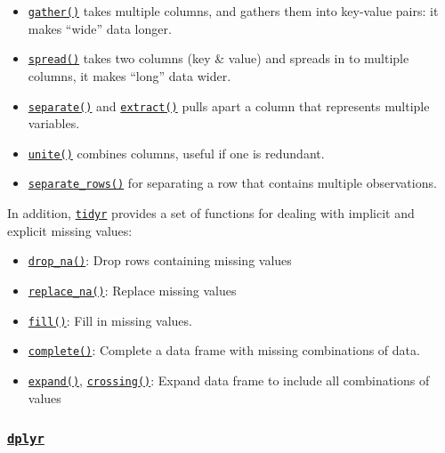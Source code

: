 \documentclass[]{book}
\providecommand{\tightlist}{%
  \setlength{\itemsep}{0pt}\setlength{\parskip}{0pt}}
\theoremstyle{definition}
\theoremstyle{definition}
\theoremstyle{definition}
\theoremstyle{remark}
\begin{document}
\begin{itemize}
\tightlist
\item
  \href{http://tidyr.tidyverse.org/reference/gather.html}{\texttt{gather()}}
  takes multiple columns, and gathers them into key-value pairs: it
  makes ``wide'' data longer.
\item
  \href{http://tidyr.tidyverse.org/reference/spread.html}{\texttt{spread()}}
  takes two columns (key \& value) and spreads in to multiple columns,
  it makes ``long'' data wider.
\item
  \href{http://tidyr.tidyverse.org/reference/separate.html}{\texttt{separate()}}
  and
  \href{http://tidyr.tidyverse.org/reference/extract.html}{\texttt{extract()}}
  pulls apart a column that represents multiple variables.
\item
  \href{http://tidyr.tidyverse.org/reference/unite.html}{\texttt{unite()}}
  combines columns, useful if one is redundant.
\item
  \href{http://tidyr.tidyverse.org/reference/gather.html}{\texttt{separate\_rows()}}
  for separating a row that contains multiple observations.
\end{itemize}

In addition, \href{http://tidyr.tidyverse.org}{\texttt{tidyr}} provides
a set of functions for dealing with implicit and explicit missing
values:

\begin{itemize}
\tightlist
\item
  \href{http://tidyr.tidyverse.org/reference/drop_na.html}{\texttt{drop\_na()}}:
  Drop rows containing missing values
\item
  \href{http://tidyr.tidyverse.org/reference/replace_na.html}{\texttt{replace\_na()}}:
  Replace missing values
\item
  \href{http://tidyr.tidyverse.org/reference/fill.html}{\texttt{fill()}}:
  Fill in missing values.
\item
  \href{http://tidyr.tidyverse.org/reference/complete.html}{\texttt{complete()}}:
  Complete a data frame with missing combinations of data.
\item
  \href{http://tidyr.tidyverse.org/reference/expand.html}{\texttt{expand()}},
  \href{http://tidyr.tidyverse.org/reference/expand.html}{\texttt{crossing()}}:
  Expand data frame to include all combinations of values
\end{itemize}

\subsubsection{\texorpdfstring{\href{http://dplyr.tidyverse.org}{\texttt{dplyr}}}{dplyr}}\label{dplyr}
\end{document}
